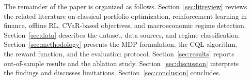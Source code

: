The remainder of the paper is organized as follows.
Section~\ref{sec:litreview} reviews the related literature on classical portfolio
optimization, reinforcement learning in finance, offline RL, CVaR-based objectives,
and macroeconomic regime detection.
Section~\ref{sec:data} describes the dataset, data sources, and regime
classification.
Section~\ref{sec:methodology} presents the MDP formulation, the CQL algorithm,
the reward function, and the evaluation protocol.
Section~\ref{sec:results} reports out-of-sample results and the ablation study.
Section~\ref{sec:discussion} interprets the findings and discusses limitations.
Section~\ref{sec:conclusion} concludes.

